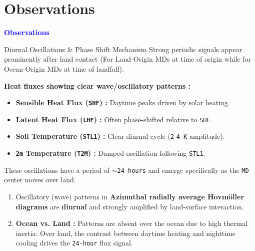 \documentclass[8pt, aspectratio=169]{beamer}
\begin{document}
\section{Observations}
\begin{frame}
    \begin{center}
        \Huge \textcolor{blue}{\textbf{Observations}} \\
    \end{center}
\end{frame}

\begin{frame}{Diurnal Oscillations \& Phase Shift Mechanism}
    Strong periodic signals appear prominently after land contact (For Land-Origin MDs at time of origin while for Ocean-Origin MDs at time of landfall).

    \vspace{0.2cm}
    \footnotesize
    \textbf{Heat fluxes showing clear wave/oscillatory patterns :}
    \begin{itemize}
        \item \textbf{Sensible Heat Flux (\texttt{SHF}) :} Daytime peaks driven by solar heating.
        \item \textbf{Latent Heat Flux (\texttt{LHF}) :} Often phase-shifted relative to \texttt{SHF}.
        \item \textbf{Soil Temperature (\texttt{STL1}) :} Clear diurnal cycle (\texttt{2}-\texttt{4 K} amplitude).
        \item \textbf{\texttt{2m} Temperature (\texttt{T2M}) :} Damped oscillation following \texttt{STL1}.
    \end{itemize}

    \vspace{0.2cm}
    \footnotesize
    These oscillations have a period of \texttt{$\sim$24 hours} and emerge specifically as the \texttt{MD} center moves over land.
    \begin{enumerate}
        \item Oscillatory (wave) patterns in \textbf{Azimuthal radially average Hovm\"oller diagrams} are \textbf{diurnal} and strongly amplified by land-surface interaction.
        \item \textbf{Ocean vs. Land :} Patterns are absent over the ocean due to high thermal inertia. Over land, the contrast between daytime heating and nighttime cooling drives the \texttt{24-hour} flux signal.
    \end{enumerate}


\end{frame}
\end{document}
